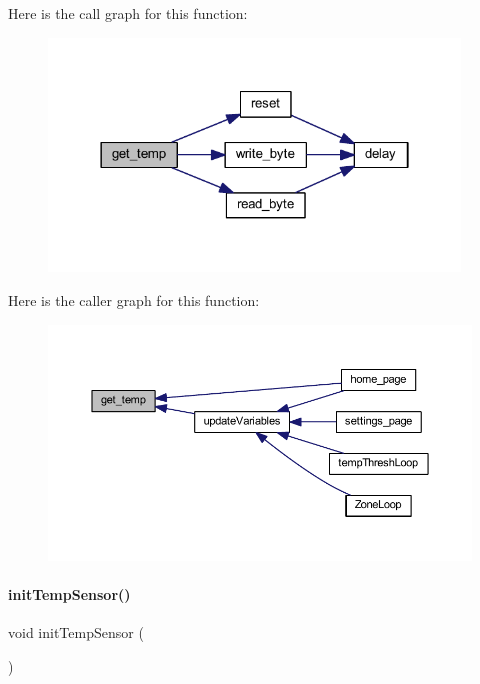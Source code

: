 Here is the call graph for this function\+:
\nopagebreak
\begin{figure}[H]
\begin{center}
\leavevmode
\includegraphics[width=310pt]{a00050_a7c1c39f9031c3ab344bbd9fa8a85479e_cgraph}
\end{center}
\end{figure}
Here is the caller graph for this function\+:
\nopagebreak
\begin{figure}[H]
\begin{center}
\leavevmode
\includegraphics[width=350pt]{a00050_a7c1c39f9031c3ab344bbd9fa8a85479e_icgraph}
\end{center}
\end{figure}
\mbox{\label{a00050_a6f113d0c9396301bb878730ed4018e44}} 
\paragraph{init\+Temp\+Sensor()}
{\footnotesize\ttfamily void init\+Temp\+Sensor (\begin{DoxyParamCaption}{ }\end{DoxyParamCaption})}

